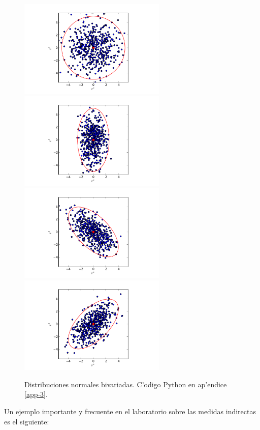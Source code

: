\documentclass[a4paper]{report}
\begin{document}
\begin{figure}[h!]
\begin{center}
\includegraphics[width=7cm]{figs/fig-1x1.pdf}  \includegraphics[width=7cm]{figs/fig-1x2.pdf}
\includegraphics[width=7cm]{figs/fig-1x2rot1.pdf}  \includegraphics[width=7cm]{figs/fig-1x2rot2.pdf}
\caption{Distribuciones normales bivariadas. C'odigo Python en ap'endice \ref{app-3}.}
\end{center}
\label{fig-dist}
\end{figure}


	Un ejemplo importante y frecuente en el laboratorio sobre las medidas indirectas es el siguiente:
\end{document}

